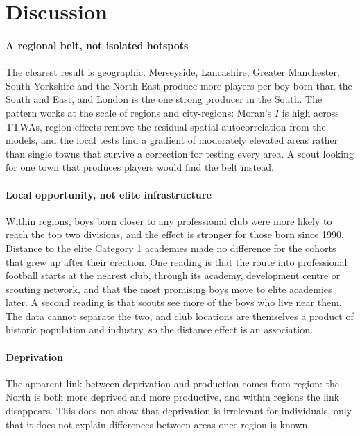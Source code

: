 \section{Discussion}
\label{sec:discussion}

\paragraph{A regional belt, not isolated hotspots} The clearest result is geographic. Merseyside, Lancashire, Greater Manchester, South Yorkshire and the North East produce more players per boy born than the South and East, and London is the one strong producer in the South. The pattern works at the scale of regions and city-regions: Moran's $I$ is high across TTWAs, region effects remove the residual spatial autocorrelation from the models, and the local tests find a gradient of moderately elevated areas rather than single towns that survive a correction for testing every area. A scout looking for one town that produces players would find the belt instead.

\paragraph{Local opportunity, not elite infrastructure} Within regions, boys born closer to any professional club were more likely to reach the top two divisions, and the effect is stronger for those born since 1990. Distance to the elite Category 1 academies made no difference for the cohorts that grew up after their creation. One reading is that the route into professional football starts at the nearest club, through its academy, development centre or scouting network, and that the most promising boys move to elite academies later. A second reading is that scouts see more of the boys who live near them. The data cannot separate the two, and club locations are themselves a product of historic population and industry, so the distance effect is an association.

\paragraph{Deprivation} The apparent link between deprivation and production comes from region: the North is both more deprived and more productive, and within regions the link disappears. This does not show that deprivation is irrelevant for individuals, only that it does not explain differences between areas once region is known.

